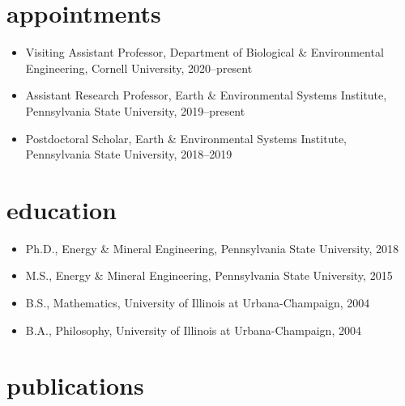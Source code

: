 \documentclass[11pt,article,oneside]{memoir}
\def\printbib#1{
\newrefcontext[sorting=none]
\printbibliography[category=#1,heading=#1,omitnumbers=false]}
\begin{document}

\section{appointments}

\mbox{}\vspace{-\dimexpr\baselineskip\relax}

\begin{itemize}[label={}]

\item Visiting Assistant Professor, Department of Biological \& Environmental Engineering, Cornell University, 2020--present

\item Assistant Research Professor, Earth \& Environmental Systems Institute, Pennsylvania State University, 2019--present

\item Postdoctoral Scholar, Earth \& Environmental Systems Institute, Pennsylvania State University, 2018--2019

\end{itemize}


\section{education}

\mbox{}\vspace{-\dimexpr\baselineskip\relax}

\begin{itemize}[label={}]

\item Ph.D., Energy \& Mineral Engineering, Pennsylvania State University, 2018

\item M.S., Energy \& Mineral Engineering, Pennsylvania State University, 2015

\item B.S., Mathematics, University of Illinois at Urbana-Champaign, 2004

\item B.A., Philosophy, University of Illinois at Urbana-Champaign, 2004

\end{itemize}

\section{publications}
\nocite{*}
\printbibliography[title={Peer-Reviewed Journal Articles}, category=papers]

\printbib{review}
\end{document}
